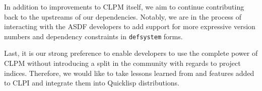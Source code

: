 \documentclass[sigconf]{acmart}
\begin{document}
In addition to improvements to CLPM itself, we aim to continue contributing
back to the upstreams of our dependencies. Notably, we are in the process of
interacting with the ASDF developers to add support for more expressive version
numbers and dependency constraints in {\tt defsystem} forms.

Last, it is our strong preference to enable developers to use the complete
power of CLPM without introducing a split in the community with regards to
project indices. Therefore, we would like to take lessons learned from and
features added to CLPI and integrate them into Quicklisp distributions.



\end{document}
